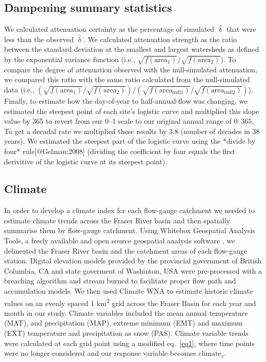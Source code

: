 \documentclass[9pt,twocolumn,twoside,lineno]{pnas-new}
\begin{document}
{\subsection*{Dampening summary statistics} We calculated attenuation certainty as the percentage of simulated $\hat{\updelta}$ that were less than the observed $\hat{\updelta}$. We calculated attenuation strength as the ratio between the standard deviation at the smallest and largest watersheds as defined by the exponential variance function (i.e., $\sqrt{f(\mathrm{area}_1)} / \sqrt{f(\mathrm{area}_2)}$). To compare the degree of attenuation observed with the null-simulated attenuation, we compared this ratio with the same ratio calculated from the null-simulated data (i.e., $\left( \sqrt{f(\mathrm{area}_1)} / \sqrt{f(\mathrm{area}_2)} \right) / \left( \sqrt{f(\mathrm{area}_{\mathrm{null} 1})} / \sqrt{f(\mathrm{area}_{\mathrm{null} 2})} \right)$). Finally, to estimate how the day-of-year to half-annual-flow was changing, we estimated the steepest point of each site's logistic curve and multiplied this slope value by 365 to revert from our 0--1 scale to our original annual range of 0--365. To get a decadal rate we multiplied these results by 3.8 (number of decades in 38 years). We estimated the steepest part of the logistic curve using the *divide by four* rule[@Gelman:2008] (dividing the coefficient by four equals the first derivitive of the logistic curve at its steepest point).

\subsection*{Climate} In order to develop a climate index for each flow-gauge catchment we needed to estimate climate trends across the Fraser River basin and then spatially summarise them by flow-gauge catchment. Using Whitebox Geospatial Analysis Tools, a freely available and open source geospatial analysis software \cite{Lindsay:2016}, we delineated the Fraser River basin and the catchment areas of each flow-gauge station. Digital elevation models provided by the provincial government of British Columbia, CA and state goverment of Washinton, USA were pre-processed with a breaching algorithm and stream burned to facilitate proper flow path and accumulation models. We then used Climate WNA to estimate historic climate values on an evenly spaced 1 km\textsuperscript{2} grid across the Fraser Basin for each year and month in our study. Climate variables included the mean annual temperature (MAT), and precipitation (MAP), extreme minimum (EMT) and maximum (EXT) temperature and precipitation as snow (PAS). Climate variable trends were calculated at each grid point using a modified eq.~\ref{eq1}, where time points were no longer considered and our response variable becomes $\mathrm{climate}_{s}$.

}
\end{document}
